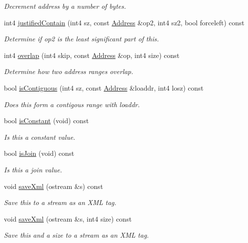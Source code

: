 \begin{DoxyCompactItemize}
\begin{DoxyCompactList}\small\item\em Decrement address by a number of bytes. \end{DoxyCompactList}\item 
int4 \mbox{\hyperlink{class_address_a71d6969466b6edf50b9542e6a75dc439}{justified\+Contain}} (int4 sz, const \mbox{\hyperlink{class_address}{Address}} \&op2, int4 sz2, bool forceleft) const
\begin{DoxyCompactList}\small\item\em Determine if {\itshape op2} is the least significant part of {\itshape this}. \end{DoxyCompactList}\item 
int4 \mbox{\hyperlink{class_address_af63d859f7cdbe890e9ca2fd2812f616c}{overlap}} (int4 skip, const \mbox{\hyperlink{class_address}{Address}} \&op, int4 size) const
\begin{DoxyCompactList}\small\item\em Determine how two address ranges overlap. \end{DoxyCompactList}\item 
bool \mbox{\hyperlink{class_address_a77b6efa62ad4f31c95f3861b79d3ed5e}{is\+Contiguous}} (int4 sz, const \mbox{\hyperlink{class_address}{Address}} \&loaddr, int4 losz) const
\begin{DoxyCompactList}\small\item\em Does {\itshape this} form a contigous range with {\itshape loaddr}. \end{DoxyCompactList}\item 
bool \mbox{\hyperlink{class_address_a8ef20a60dfb144bb91c466432e377eb5}{is\+Constant}} (void) const
\begin{DoxyCompactList}\small\item\em Is this a {\itshape constant} {\itshape value}. \end{DoxyCompactList}\item 
bool \mbox{\hyperlink{class_address_ae0e5cdee35b24c75adcbfc444e6e5be6}{is\+Join}} (void) const
\begin{DoxyCompactList}\small\item\em Is this a {\itshape join} {\itshape value}. \end{DoxyCompactList}\item 
void \mbox{\hyperlink{class_address_ab483818c0d4947d565828c53ffd3cb4b}{save\+Xml}} (ostream \&s) const
\begin{DoxyCompactList}\small\item\em Save this to a stream as an X\+ML tag. \end{DoxyCompactList}\item 
void \mbox{\hyperlink{class_address_a9369f5ae7596c2aeecfb1a000454b2e5}{save\+Xml}} (ostream \&s, int4 size) const
\begin{DoxyCompactList}\small\item\em Save this and a size to a stream as an X\+ML tag. \end{DoxyCompactList}\end{DoxyCompactItemize}
